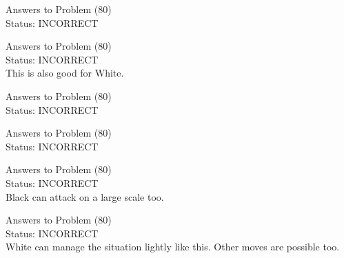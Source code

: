 \documentclass[11pt]{article}
\begin{document}
\begin{minipage}[t]{0.5\textwidth}
  {\centering
  
  Answers to Problem (80)\\
  Status: INCORRECT\\
  
  }
\end{minipage}
\begin{minipage}[t]{0.5\textwidth}
  {\centering
  
  Answers to Problem (80)\\
  Status: INCORRECT\\
  This is also good for White.\\
  }
\end{minipage}
\begin{minipage}[t]{0.5\textwidth}
  {\centering
  
  Answers to Problem (80)\\
  Status: INCORRECT\\
  
  }
\end{minipage}
\begin{minipage}[t]{0.5\textwidth}
  {\centering
  
  Answers to Problem (80)\\
  Status: INCORRECT\\
  
  }
\end{minipage}
\begin{minipage}[t]{0.5\textwidth}
  {\centering
  
  Answers to Problem (80)\\
  Status: INCORRECT\\
  Black can attack on a large scale too.\\
  }
\end{minipage}
\begin{minipage}[t]{0.5\textwidth}
  {\centering
  
  Answers to Problem (80)\\
  Status: INCORRECT\\
  White can manage the situation lightly like this. Other moves are possible too.\\
  }
\end{minipage}
\end{document}
